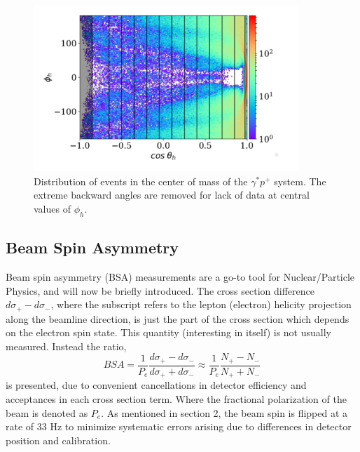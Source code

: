 \begin{figure}
  \begin{center}
    \includegraphics[width=10cm]{image/cos_theta_h_phi_h_binned.pdf}
    \caption{Distribution of events in the center of mass of the $\gamma^* p^+$ system.  The extreme backward angles are removed for lack of data at central values of $\phi_h$.}
  \end{center}
\end{figure}

\subsection{Beam Spin Asymmetry}
Beam spin asymmetry (BSA) measurements are a go-to tool for Nuclear/Particle Physics, and will now be briefly introduced.  The cross section difference $d\sigma_{+} - d\sigma_{-}$, where the subscript refers to the lepton (electron) helicity projection along the beamline direction, is just the part of the cross section which depends on the electron spin state.  This quantity (interesting in itself) is not usually measured.  Instead the ratio,
\begin{equation}
	BSA = \frac{1}{P_e} \frac{d\sigma_{+} - d\sigma_{-}}{d\sigma_{+} + d\sigma_{-}} \approx \frac{1}{P_e} \frac{N_+ - N_-}{N_+ + N_-}
\end{equation}    
is presented, due to convenient cancellations in detector efficiency and acceptances in each cross section term.  Where the fractional polarization of the beam is denoted as $P_e$.  As mentioned in section 2, the beam spin is flipped at a rate of 33 Hz to minimize systematic errors arising due to differences in detector position and calibration.  
\\

